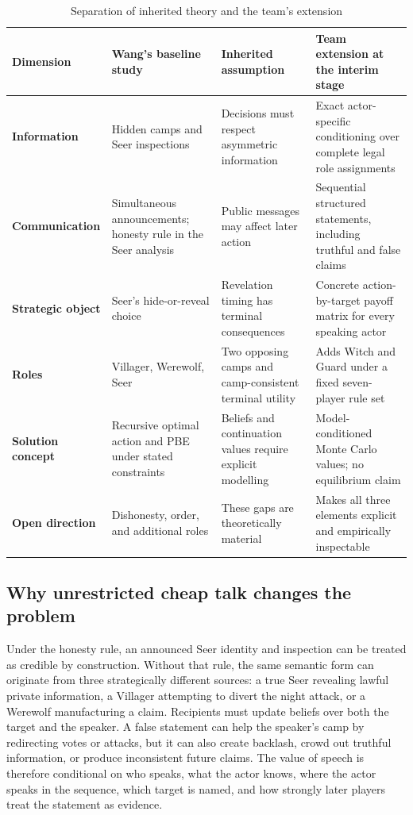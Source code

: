 \documentclass[11pt,a4paper]{article}
\begin{document}
\begin{table}[htbp]
\centering
\caption{Separation of inherited theory and the team's extension}
\begin{tabularx}{\textwidth}{>{\bfseries}p{}YYY}
\toprule
Dimension & Wang's baseline study & Inherited assumption & Team extension at the interim stage \\
\midrule
Information & Hidden camps and Seer inspections & Decisions must respect asymmetric information & Exact actor-specific conditioning over complete legal role assignments \\
Communication & Simultaneous announcements; honesty rule in the Seer analysis & Public messages may affect later action & Sequential structured statements, including truthful and false claims \\
Strategic object & Seer's hide-or-reveal choice & Revelation timing has terminal consequences & Concrete action-by-target payoff matrix for every speaking actor \\
Roles & Villager, Werewolf, Seer & Two opposing camps and camp-consistent terminal utility & Adds Witch and Guard under a fixed seven-player rule set \\
Solution concept & Recursive optimal action and PBE under stated constraints & Beliefs and continuation values require explicit modelling & Model-conditioned Monte Carlo values; no equilibrium claim \\
Open direction & Dishonesty, order, and additional roles & These gaps are theoretically material & Makes all three elements explicit and empirically inspectable \\
\bottomrule
\end{tabularx}
\end{table}

\subsection{Why unrestricted cheap talk changes the problem}

Under the honesty rule, an announced Seer identity and inspection can be treated as credible by construction. Without that rule, the same semantic form can originate from three strategically different sources: a true Seer revealing lawful private information, a Villager attempting to divert the night attack, or a Werewolf manufacturing a claim. Recipients must update beliefs over both the target and the speaker. A false statement can help the speaker's camp by redirecting votes or attacks, but it can also create backlash, crowd out truthful information, or produce inconsistent future claims. The value of speech is therefore conditional on who speaks, what the actor knows, where the actor speaks in the sequence, which target is named, and how strongly later players treat the statement as evidence.
\end{document}
